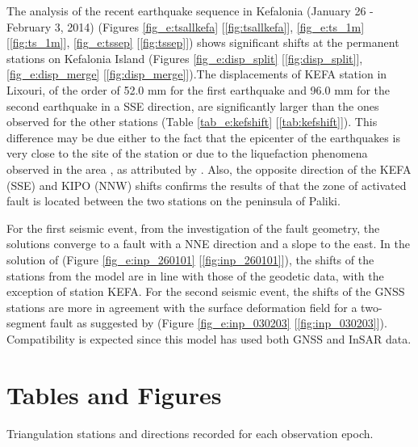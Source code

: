 \begin{extsum}
The analysis of the recent earthquake sequence in Kefalonia (January 26 - February 3, 2014) (Figures \ref{fig_e:tsallkefa} [\ref{fig:tsallkefa}], \ref{fig_e:ts_1m} [\ref{fig:ts_1m}], \ref{fig_e:tssep} [\ref{fig:tssep}]) shows significant shifts at the permanent stations on Kefalonia Island (Figures \ref{fig_e:disp_split} [\ref{fig:disp_split}], \ref{fig_e:disp_merge} [\ref{fig:disp_merge}]).The displacements of  KEFA station in Lixouri, of the order of 52.0 mm for the first earthquake and 96.0 mm for the second earthquake in a SSE direction, are significantly larger than the ones observed for the other stations (Table \ref{tab_e:kefshift} [\ref{tab:kefshift}]). This difference may be due either to the fact that the epicenter of the earthquakes is very close to the site of the station or due to the liquefaction phenomena observed in the area \citep{Valkaniotis2014,Papadopoulos2014}, as attributed by \citet{Ganas2015}. Also, the opposite direction of the KEFA (SSE) and KIPO (NNW) shifts confirms the results of \citet{Sokos2015, Sakkas2015, Ganas2015, Karakostas2015} that the zone of activated fault is located between the two stations on the peninsula of Paliki.

For the first seismic event, from the investigation of the fault geometry, the solutions converge to a fault with a NNE direction and a slope to the east. In the solution of \citet{Ganas2015} (Figure \ref{fig_e:inp_260101} [\ref{fig:inp_260101}]), the shifts of the stations from the \citet{Okada1985} model  are in line with those of the geodetic data, with the exception of station KEFA. For the second seismic event, the shifts of the GNSS stations are more in agreement with the \citet{Okada1985} surface deformation field for a two-segment fault as suggested by \citet{Boncori2015} (Figure \ref{fig_e:inp_030203} [\ref{fig:inp_030203}]). Compatibility is expected since this model has used both GNSS and InSAR data.

\chapter*{Tables and Figures}
\newpage

\begin{table}[H]
  \caption{Triangulation stations and directions recorded for each observation epoch.}
  \label{tab_e:directions_full}


\end{table}
\end{extsum}

